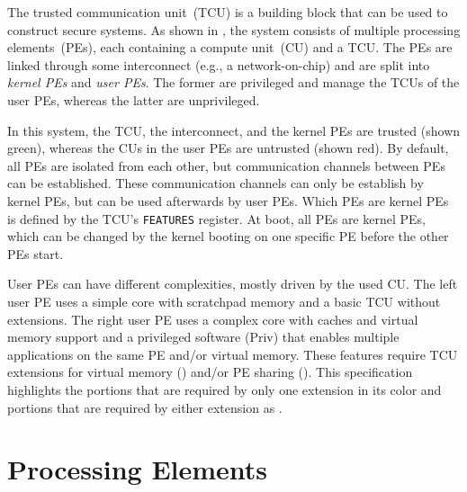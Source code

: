 \noindent The trusted communication unit~(TCU) is a building block that can be used to construct
secure systems. As shown in , the system consists of multiple processing
elements~(PEs), each containing a compute unit~(CU) and a TCU. The PEs are linked through some
interconnect (e.g., a network-on-chip) and are split into \emph{kernel PEs} and \emph{user PEs}. The
former are privileged and manage the TCUs of the user PEs, whereas the latter are unprivileged.

In this system, the TCU, the interconnect, and the kernel PEs are trusted (shown green), whereas the
CUs in the user PEs are untrusted (shown red). By default, all PEs are isolated from each other, but
communication channels between PEs can be established. These communication channels can only be
establish by kernel PEs, but can be used afterwards by user PEs. Which PEs are kernel PEs is defined
by the TCU's \texttt{FEATURES} register. At boot, all PEs are kernel PEs, which can be changed by
the kernel booting on one specific PE before the other PEs start.

User PEs can have different complexities, mostly driven by the used CU. The left user PE uses a
simple core with scratchpad memory and a basic TCU without extensions. The right user PE uses a
complex core with caches and virtual memory support and a privileged software (Priv) that enables
multiple applications on the same PE and/or virtual memory. These features require TCU extensions
for virtual memory () and/or PE sharing (). This specification highlights
the portions that are required by only one extension in its color and portions that are required by
either extension as .

\section{Processing Elements}

